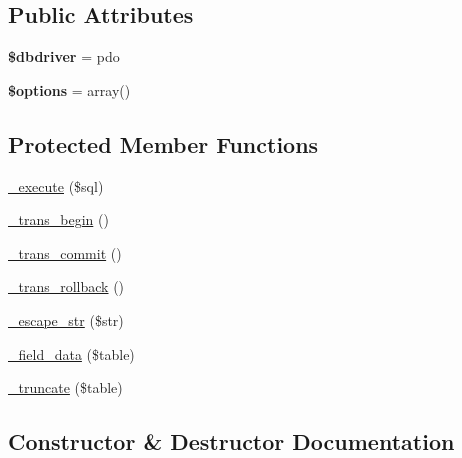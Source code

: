 \subsection*{Public Attributes}
\begin{DoxyCompactItemize}
\item 
\mbox{\label{class_c_i___d_b__pdo__driver_a63137f501d28661f40edf44620b90d43}} 
{\bfseries \$dbdriver} = \textquotesingle{}pdo\textquotesingle{}
\item 
\mbox{\label{class_c_i___d_b__pdo__driver_a127238766ddc9107ab6b2168148c0c3d}} 
{\bfseries \$options} = array()
\end{DoxyCompactItemize}
\subsection*{Protected Member Functions}
\begin{DoxyCompactItemize}
\item 
\mbox{\hyperlink{class_c_i___d_b__pdo__driver_a583c8f7e4a6242607a207c59ff8e84dc}{\+\_\+execute}} (\$sql)
\item 
\mbox{\hyperlink{class_c_i___d_b__pdo__driver_a5cb4f9eb3d9ba1b7042dd5c097dbfe40}{\+\_\+trans\+\_\+begin}} ()
\item 
\mbox{\hyperlink{class_c_i___d_b__pdo__driver_a8cb45f83bfd5f5bd16d83e7f94accf9a}{\+\_\+trans\+\_\+commit}} ()
\item 
\mbox{\hyperlink{class_c_i___d_b__pdo__driver_aef4e74826929340b08945409462e3c6d}{\+\_\+trans\+\_\+rollback}} ()
\item 
\mbox{\hyperlink{class_c_i___d_b__pdo__driver_a03c9fec23f9fe84aec033fcd4678b4e0}{\+\_\+escape\+\_\+str}} (\$str)
\item 
\mbox{\hyperlink{class_c_i___d_b__pdo__driver_a0a6e0ba0e25b3c56d18249df1bcfd261}{\+\_\+field\+\_\+data}} (\$table)
\item 
\mbox{\hyperlink{class_c_i___d_b__pdo__driver_a80dd8199909ae1d33cdbc3f64b7e5a9a}{\+\_\+truncate}} (\$table)
\end{DoxyCompactItemize}


\subsection{Constructor \& Destructor Documentation}
\mbox{\label{class_c_i___d_b__pdo__driver_a35e51848ac2748becec85f5058e1aebe}} 
